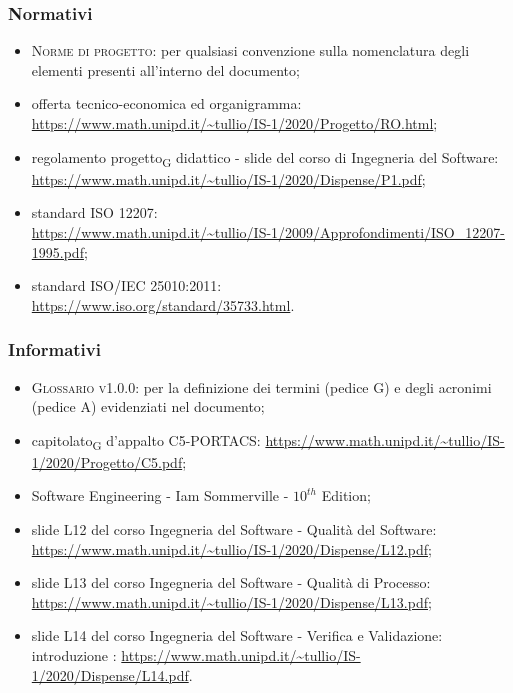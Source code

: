     \subsubsection{Normativi}
    \begin{itemize}
    	\item \textsc{Norme di progetto}: per qualsiasi convenzione sulla nomenclatura degli elementi presenti all'interno del documento;
    	\item offerta tecnico-economica ed organigramma: \newline  \url{https://www.math.unipd.it/~tullio/IS-1/2020/Progetto/RO.html};
    	\item regolamento \gls{progetto}\textsubscript{G} didattico - slide del corso di Ingegneria del Software: \newline \url{https://www.math.unipd.it/~tullio/IS-1/2020/Dispense/P1.pdf};
        \item standard ISO 12207:\\ \url{https://www.math.unipd.it/~tullio/IS-1/2009/Approfondimenti/ISO_12207-1995.pdf};
        \item standard ISO/IEC 25010:2011:\\
        \url{https://www.iso.org/standard/35733.html}.
    \end{itemize}

    \subsubsection{Informativi}
    \begin{itemize}
        \item \textsc{Glossario v1.0.0}: per la definizione dei termini (pedice G) e degli acronimi (pedice A) evidenziati nel documento;
    	\item \gls{capitolato}\textsubscript{G} d'appalto C5-PORTACS: \newline
    	\url{https://www.math.unipd.it/~tullio/IS-1/2020/Progetto/C5.pdf};
       	\item Software Engineering - Iam Sommerville - $10^{th}$ Edition;
        \item slide L12 del corso Ingegneria del Software - Qualità del Software:\newline
        \url{https://www.math.unipd.it/~tullio/IS-1/2020/Dispense/L12.pdf};
        \item slide L13 del corso Ingegneria del Software - Qualità di Processo:\newline
        \url{https://www.math.unipd.it/~tullio/IS-1/2020/Dispense/L13.pdf};
        \item slide L14 del corso Ingegneria del Software - Verifica e Validazione: introduzione :\newline
        \url{https://www.math.unipd.it/~tullio/IS-1/2020/Dispense/L14.pdf}.
    \end{itemize}